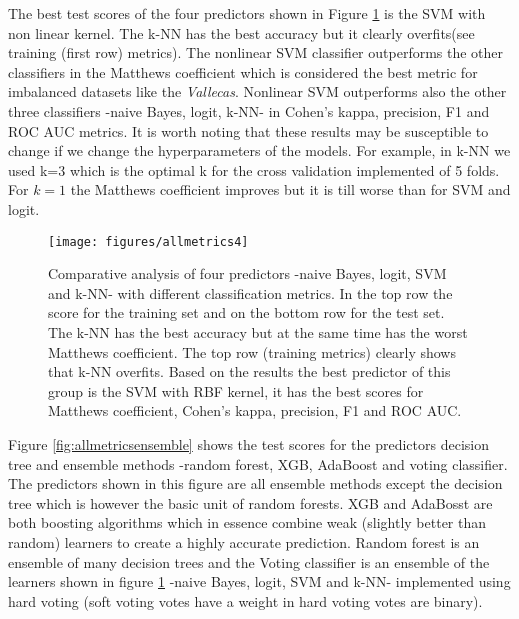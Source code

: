 \documentclass[11pt]{article}
\theoremstyle{definition}
\theoremstyle{remark}
\begin{document}
The best test scores of the four predictors shown in Figure \ref{fig:mat4dummy} is the SVM with non linear kernel. The k-NN has the best accuracy but it clearly overfits(see training (first row) metrics). The nonlinear SVM classifier outperforms the other classifiers in the Matthews coefficient which is considered the best metric for imbalanced datasets like the \emph{Vallecas}. Nonlinear SVM outperforms also the other three classifiers -naive Bayes, logit, k-NN- in Cohen's kappa, precision, F1 and ROC AUC metrics. It is worth noting that these results may be susceptible to change if we change the hyperparameters of the models. For example, in k-NN we used k=3 which is the optimal k for the cross validation implemented of 5 folds. For $k=1$ the Matthews coefficient improves but it is till worse than for SVM and logit.
\begin{figure}[H] 
        \centering
        \texttt{[image: figures/allmetrics4]}
        \caption{Comparative analysis of four predictors -naive Bayes, logit, SVM and k-NN- with different classification metrics. In the top row the score for the training set and on the bottom row for the test set. The k-NN has the best accuracy but at the same time has the worst Matthews coefficient. The top row (training metrics) clearly shows that k-NN overfits. Based on the results the best predictor of this group is the SVM with RBF kernel, it has the best scores for Matthews coefficient, Cohen's kappa, precision, F1 and ROC AUC. 
        } \label{fig:mat4dummy}
\end{figure}

Figure \ref{fig:allmetricsensemble} shows the test scores for the predictors decision tree and ensemble methods -random forest, XGB, AdaBoost and voting classifier. The predictors shown in this figure are all ensemble methods except the decision tree which is however the basic unit  of random forests. XGB and AdaBosst are both boosting algorithms which in essence combine weak (slightly better than random) learners to create a highly accurate prediction. Random forest is an ensemble of many decision trees and the Voting classifier is an ensemble of the learners shown in figure \ref{fig:mat4dummy} -naive Bayes, logit, SVM and k-NN- implemented using hard voting (soft voting votes have a weight in hard voting votes are binary).
\end{document}
